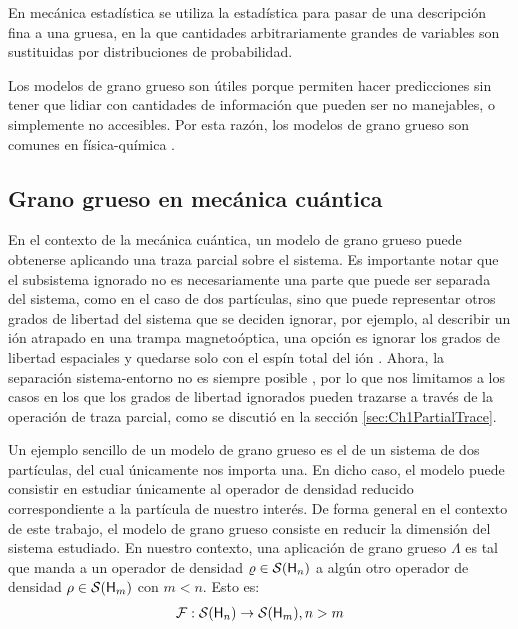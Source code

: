 En mecánica estadística se utiliza la estadística para pasar de una descripción fina a una gruesa, en la que cantidades arbitrariamente grandes de variables son sustituidas por distribuciones de probabilidad.

Los modelos de grano grueso son útiles porque permiten hacer predicciones sin tener que lidiar con cantidades de información que pueden ser no manejables, o simplemente no accesibles. Por esta razón, los modelos de grano grueso son comunes en física-química \cite{PhysChemI,PhysChemII,PhysChemIII} .


\subsection{Grano grueso en mecánica cuántica}


En el contexto de la mecánica cuántica, un modelo de grano grueso puede obtenerse aplicando una traza parcial sobre el sistema. Es importante notar que el subsistema ignorado no es necesariamente una parte que puede ser separada del sistema, como en el caso de dos partículas, sino que puede representar otros grados de libertad del sistema que se deciden ignorar, por ejemplo, al describir un ión atrapado en una trampa magnetoóptica, una opción es ignorar los grados de libertad espaciales y quedarse solo con el espín total del ión \cite{Fox}. Ahora, la separación sistema-entorno no es siempre posible \cite{Macro-To-Micro}, por lo que nos limitamos a los casos en los que los grados de libertad ignorados pueden trazarse a través de la operación de traza parcial, como se discutió en la sección \ref{sec:Ch1PartialTrace}.

Un ejemplo sencillo de un modelo de grano grueso es el de un sistema de dos partículas, del cual únicamente nos importa una. En dicho caso, el modelo puede consistir en estudiar únicamente al operador de densidad reducido correspondiente a la partícula de nuestro interés. De forma general en el contexto de este trabajo, el modelo de grano grueso consiste en reducir la dimensión del sistema estudiado. En nuestro contexto, una aplicación de grano grueso $\Lambda$ es tal que manda a un operador de densidad $\varrho\in\mathcal{S}({\sf H}_{n})$ a algún otro operador de densidad $\rho\in\mathcal{S}({\sf H}_{m})$ con $m<n$. Esto es:
\begin{align}
    \mathcal{F}:\mathcal{S}({\sf H}_{n})\to \mathcal{S}({\sf H}_{m}), n>m\nonumber
\end{align}